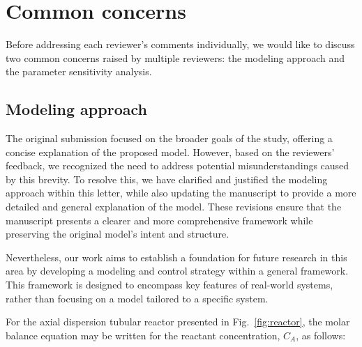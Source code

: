 \documentclass[12pt,answers]{exam}
\begin{document}
\section{Common concerns} \label{sec:reviewer_0}

Before addressing each reviewer's comments individually, we would like to discuss two common concerns raised by multiple reviewers: the modeling approach and the parameter sensitivity analysis.

\subsection{Modeling approach} \label{sec:model}

The original submission focused on the broader goals of the study, offering a concise explanation of the proposed model. However, based on the reviewers’ feedback, we recognized the need to address potential misunderstandings caused by this brevity. To resolve this, we have clarified and justified the modeling approach within this letter, while also updating the manuscript to provide a more detailed and general explanation of the model. These revisions ensure that the manuscript presents a clearer and more comprehensive framework while preserving the original model’s intent and structure.


Nevertheless, our work aims to establish a foundation for future research in this area by developing a modeling and control strategy within a general framework. This framework is designed to encompass key features of real-world systems, rather than focusing on a model tailored to a specific system. 

For the axial dispersion tubular reactor presented in Fig.~\ref{fig:reactor}, the molar balance equation may be written for the reactant concentration, $C_A$, as follows:
\end{document}
